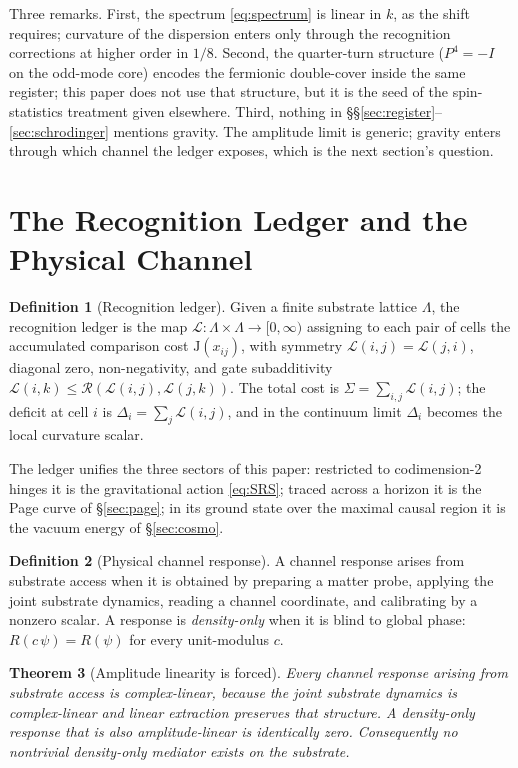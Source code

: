 \documentclass[11pt,letterpaper]{article}
\newtheorem{theorem}{Theorem}[section]
\theoremstyle{definition}
\newtheorem{definition}[theorem]{Definition}
\newcommand{\J}{\mathrm{J}}
\begin{document}
Three remarks.  First, the spectrum \eqref{eq:spectrum} is linear in
$k$, as the shift requires; curvature of the dispersion enters only
through the recognition corrections at higher order in $1/8$.  Second,
the quarter-turn structure ($P^4=-I$ on the odd-mode core) encodes the
fermionic double-cover inside the same register; this paper does not
use that structure, but it is the seed of the spin-statistics
treatment given elsewhere.  Third, nothing in
\S\S\ref{sec:register}--\ref{sec:schrodinger} mentions gravity.  The
amplitude limit is generic; gravity enters through which channel the
ledger exposes, which is the next section's question.

\section{The Recognition Ledger and the Physical Channel}
\label{sec:channel}

\begin{definition}[Recognition ledger]\label{def:ledger}
Given a finite substrate lattice $\Lambda$, the recognition ledger is
the map $\mathcal{L}:\Lambda\times\Lambda\to[0,\infty)$ assigning to
each pair of cells the accumulated comparison cost $\J(x_{ij})$, with
symmetry $\mathcal{L}(i,j)=\mathcal{L}(j,i)$, diagonal zero,
non-negativity, and gate subadditivity
$\mathcal{L}(i,k)\le\mathcal{R}(\mathcal{L}(i,j),\mathcal{L}(j,k))$.
The total cost is $\Sigma=\sum_{i,j}\mathcal{L}(i,j)$; the deficit at
cell $i$ is $\Delta_i=\sum_j\mathcal{L}(i,j)$, and in the continuum
limit $\Delta_i$ becomes the local curvature scalar.
\end{definition}

The ledger unifies the three sectors of this paper: restricted to
codimension-2 hinges it is the gravitational action \eqref{eq:SRS};
traced across a horizon it is the Page curve of \S\ref{sec:page}; in
its ground state over the maximal causal region it is the vacuum
energy of \S\ref{sec:cosmo}.

\begin{definition}[Physical channel response]\label{def:physchannel}
A channel response arises from substrate access when it is obtained by
preparing a matter probe, applying the joint substrate dynamics,
reading a channel coordinate, and calibrating by a nonzero scalar.  A
response is \emph{density-only} when it is blind to global phase:
$R(c\,\psi)=R(\psi)$ for every unit-modulus $c$.
\end{definition}

\begin{theorem}[Amplitude linearity is forced]\label{thm:amp}
Every channel response arising from substrate access is
complex-linear, because the joint substrate dynamics is complex-linear
and linear extraction preserves that structure.  A density-only
response that is also amplitude-linear is identically zero.
Consequently no nontrivial density-only mediator exists on the
substrate.
\end{theorem}
\end{document}
